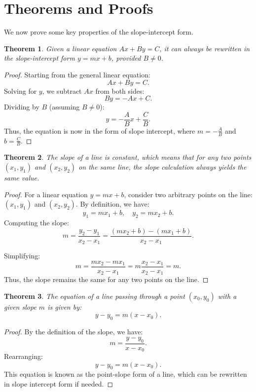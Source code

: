 \documentclass[10pt]{article}
\newtheorem{theorem}{Theorem}
\begin{document}
\section{\textbf{Theorems and Proofs}}
We now prove some key properties of the slope-intercept form.

\begin{theorem}
Given a linear equation \( Ax + By = C \), it can always be rewritten in the slope-intercept form \( y = mx + b \), provided \( B \neq 0 \).
\end{theorem}

\begin{proof}
Starting from the general linear equation:
\[
Ax + By = C.
\]
Solving for \( y \), we subtract \( Ax \) from both sides:
\[
By = -Ax + C.
\]
Dividing by \( B \) (assuming \( B \neq 0 \)):
\[
y = -\frac{A}{B}x + \frac{C}{B}.
\]
Thus, the equation is now in the form of slope intercept, where \( m = -\frac{A}{B} \) and \( b = \frac{C}{B} \).
\end{proof}

\begin{theorem}
The slope of a line is constant, which means that for any two points \( (x_1, y_1) \) and \( (x_2, y_2) \) on the same line, the slope calculation always yields the same value.
\end{theorem}

\begin{proof}
For a linear equation \( y = mx + b \), consider two arbitrary points on the line: \( (x_1, y_1) \) and \( (x_2, y_2) \). By definition, we have:
\[
y_1 = m x_1 + b, \quad y_2 = m x_2 + b.
\]
Computing the slope:
\[
m = \frac{y_2 - y_1}{x_2 - x_1} = \frac{(m x_2 + b) - (m x_1 + b)}{x_2 - x_1}.
\]

Simplifying:
\[
m = \frac{m x_2 - m x_1}{x_2 - x_1} = m \frac{x_2 - x_1}{x_2 - x_1} = m.
\]
Thus, the slope remains the same for any two points on the line.
\end{proof}

\begin{theorem}
The equation of a line passing through a point \( (x_0, y_0) \) with a given slope \( m \) is given by:
\[
y - y_0 = m(x - x_0).
\]
\end{theorem}

\begin{proof}
By the definition of the slope, we have:
\[
m = \frac{y - y_0}{x - x_0}.
\]
Rearranging:
\[
y - y_0 = m(x - x_0).
\]
This equation is known as the point-slope form of a line, which can be rewritten in slope intercept form if needed.
\end{proof} 
\end{document}
